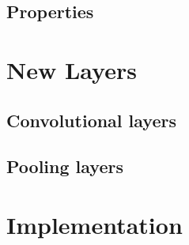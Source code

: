     \subsection{Properties}
\section{New Layers}
    \subsection{Convolutional layers}

    \subsection{Pooling layers}

\section{Implementation}
